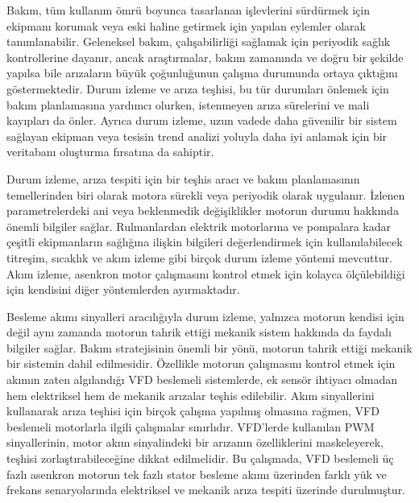 Bakım, tüm kullanım ömrü boyunca tasarlanan işlevlerini sürdürmek için ekipmanı korumak veya eski haline getirmek için yapılan eylemler olarak tanımlanabilir. Geleneksel bakım, çalışabilirliği sağlamak için periyodik sağlık kontrollerine dayanır, ancak araştırmalar, bakım zamanında ve doğru bir şekilde yapılsa bile arızaların büyük çoğunluğunun çalışma durumunda ortaya çıktığını göstermektedir. Durum izleme ve arıza teşhisi, bu tür durumları önlemek için bakım planlamasına yardımcı olurken, istenmeyen arıza sürelerini ve mali kayıpları da önler. Ayrıca durum izleme, uzun vadede daha güvenilir bir sistem sağlayan ekipman veya tesisin trend analizi yoluyla daha iyi anlamak için bir veritabanı oluşturma fırsatına da sahiptir.

Durum izleme, arıza tespiti için bir teşhis aracı ve bakım planlamasının temellerinden biri olarak motora sürekli veya periyodik olarak uygulanır. İzlenen parametrelerdeki ani veya beklenmedik değişiklikler motorun durumu hakkında önemli bilgiler sağlar. Rulmanlardan elektrik motorlarına ve pompalara kadar çeşitli ekipmanların sağlığına ilişkin bilgileri değerlendirmek için kullanılabilecek titreşim, sıcaklık ve akım izleme gibi birçok durum izleme yöntemi mevcuttur. Akım izleme, asenkron motor çalışmasını kontrol etmek için kolayca ölçülebildiği için kendisini diğer yöntemlerden ayırmaktadır.

Besleme akımı sinyalleri aracılığıyla durum izleme, yalnızca motorun kendisi için değil aynı zamanda motorun tahrik ettiği mekanik sistem hakkında da faydalı bilgiler sağlar. Bakım stratejisinin önemli bir yönü, motorun tahrik ettiği mekanik bir sistemin dahil edilmesidir. Özellikle motorun çalışmasını kontrol etmek için akımın zaten algılandığı VFD beslemeli sistemlerde, ek sensör ihtiyacı olmadan hem elektriksel hem de mekanik arızalar teşhis edilebilir. Akım sinyallerini kullanarak arıza teşhisi için birçok çalışma yapılmış olmasına rağmen, VFD beslemeli motorlarla ilgili çalışmalar sınırlıdır. VFD'lerde kullanılan PWM sinyallerinin, motor akım sinyalindeki bir arızanın özelliklerini maskeleyerek, teşhisi zorlaştırabileceğine dikkat edilmelidir. Bu çalışmada, VFD beslemeli üç fazlı asenkron motorun tek fazlı stator besleme akımı üzerinden farklı yük ve frekans senaryolarında elektriksel ve mekanik arıza tespiti üzerinde durulmuştur.


